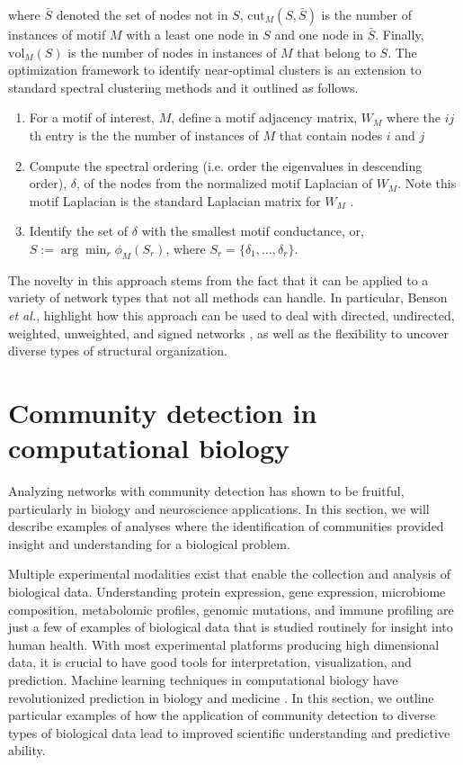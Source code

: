 where $\bar{S}$ denoted the set of nodes not in $S$, $\text{cut}_{M}(S,\bar{S})$ is the number of instances of motif $M$ with a least one node in $S$ and one node in $\bar{S}$. Finally, $\text{vol}_{M}(S)$ is the number of nodes in instances of $M$ that belong to $S$. The optimization framework to identify near-optimal clusters is an extension to standard spectral clustering methods and it outlined as follows. 
\begin{enumerate}
\item For a motif of interest, $M$, define a motif adjacency matrix, $W_{M}$ where the $ij$th entry is the the number of instances of $M$ that contain nodes $i$ and $j$
\item Compute the spectral ordering (i.e. order the eigenvalues in descending order), $\delta$, of the nodes from the normalized motif Laplacian of $W_{M}$. Note this motif Laplacian is the standard Laplacian matrix for $W_{M}$ \cite{laplacian}. 
\item Identify the set of $\delta$ with the smallest motif conductance, or, $S := \arg \min_{r} \phi_{M}(S_{r})$, where $S_{r}=\{\delta_{1}, \dots, \delta_{r}\}$. 
\end{enumerate}

The novelty in this approach stems from the fact that it can be applied to a variety of network types that not all methods can handle. In particular, Benson \emph{et al.}, highlight how this approach can be used to deal with directed, undirected, weighted, unweighted, and signed networks \cite{benson2}, as well as the flexibility to uncover diverse types of structural organization. 

\section{Community detection in computational biology}
Analyzing networks with community detection has shown to be fruitful, particularly in biology and neuroscience applications. In this section, we will describe examples of analyses where the identification of communities provided insight and understanding for a biological problem. 

Multiple experimental modalities exist that enable the collection and analysis of biological data. Understanding protein expression, gene expression, microbiome composition, metabolomic profiles, genomic mutations, and immune profiling are just a few of examples of biological data that is studied routinely for insight into human health. With most experimental platforms producing high dimensional data, it is crucial to have good tools for interpretation, visualization, and prediction. Machine learning techniques in computational biology have revolutionized prediction in biology and medicine \cite{systemsImmuno,deepGenome,machineGenomics}. In this section, we outline particular examples of how the application of community detection to diverse types of biological data lead to improved scientific understanding and predictive ability.

